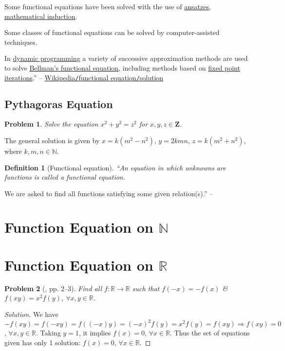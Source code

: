\documentclass{article}
\numberwithin{equation}{section}
\newtheorem{definition}{Definition}[section]
\newtheorem{problem}{Problem}[section]
\begin{document}
Some functional equations have been solved with the use of \href{https://en.wikipedia.org/wiki/Ansatz}{ansatzes}, \href{https://en.wikipedia.org/wiki/Mathematical_induction}{mathematical induction}.

Some classes of functional equations can be solved by computer-assisted techniques.

In \href{https://en.wikipedia.org/wiki/Dynamic_programming}{dynamic programming} a variety of successive approximation methods are used to solve \href{https://en.wikipedia.org/wiki/Bellman_equation}{Bellman's functional equation}, including methods based on \href{https://en.wikipedia.org/wiki/Fixed_point_iteration}{fixed point iterations}.'' -- \href{https://en.wikipedia.org/wiki/Functional_equation#Solution}{Wikipedia\texttt{/}functional equation\texttt{/}solution}

\subsection{Pythagoras Equation}

\begin{problem}
	Solve the equation $x^2 + y^2 = z^2$ for $x,y,z\in\mathbf{Z}$.
\end{problem}
The general solution is given by $x = k(m^2 - n^2)$, $y = 2kmn$, $z = k(m^2 + n^2)$, where $k,m,n\in\mathbb{N}$.

\begin{definition}[Functional equation]
	``An equation in which unknowns are functions is called a \emph{functional equation}.
\end{definition}
We are asked to find all functions satisfying some given relation(s).'' -- \cite[p. 2]{Venkatachala2013}

\section{Function Equation on $\mathbb{N}$}

\section{Function Equation on $\mathbb{R}$}

\begin{problem}[\cite{Venkatachala2013}, pp. 2--3]
	Find all $f:\mathbb{R}\to\mathbb{R}$ such that $f(-x) = -f(x)$ \& $f(xy) = x^2f(y)$, $\forall x,y\in\mathbb{R}$.
\end{problem}

\begin{proof}[Solution]
	We have $-f(xy) = f(-xy) = f((-x)y) = (-x)^2f(y) = x^2f(y) = f(xy)\Rightarrow f(xy) = 0$, $\forall x,y\in\mathbb{R}$. Taking $y = 1$, it implies $f(x) = 0$, $\forall x\in\mathbb{R}$. Thus the set of equations given has only 1 solution: $f(x) = 0$, $\forall x\in\mathbb{R}$.
\end{proof}



\printbibliography[heading=bibintoc]
	
\end{document}
